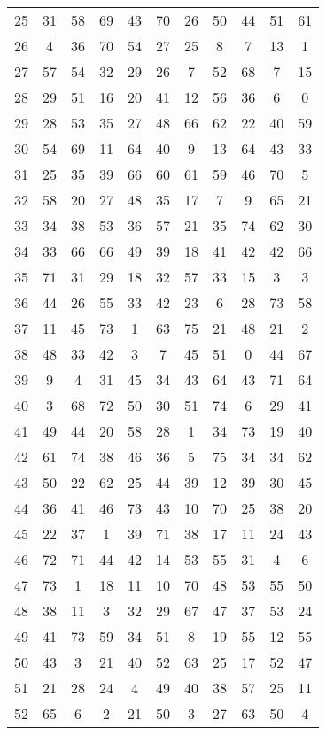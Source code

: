 \begin{table}
\begin{tabular}{c c c c c c c c c c c }
25 & 31 & 58 & 69 & 43 & 70 & 26 & 50 & 44 & 51 & 61 \\
26 & 4 & 36 & 70 & 54 & 27 & 25 & 8 & 7 & 13 & 1 \\
27 & 57 & 54 & 32 & 29 & 26 & 7 & 52 & 68 & 7 & 15 \\
28 & 29 & 51 & 16 & 20 & 41 & 12 & 56 & 36 & 6 & 0 \\
29 & 28 & 53 & 35 & 27 & 48 & 66 & 62 & 22 & 40 & 59 \\
30 & 54 & 69 & 11 & 64 & 40 & 9 & 13 & 64 & 43 & 33 \\
31 & 25 & 35 & 39 & 66 & 60 & 61 & 59 & 46 & 70 & 5 \\
32 & 58 & 20 & 27 & 48 & 35 & 17 & 7 & 9 & 65 & 21 \\
33 & 34 & 38 & 53 & 36 & 57 & 21 & 35 & 74 & 62 & 30 \\
34 & 33 & 66 & 66 & 49 & 39 & 18 & 41 & 42 & 42 & 66 \\
35 & 71 & 31 & 29 & 18 & 32 & 57 & 33 & 15 & 3 & 3 \\
36 & 44 & 26 & 55 & 33 & 42 & 23 & 6 & 28 & 73 & 58 \\
37 & 11 & 45 & 73 & 1 & 63 & 75 & 21 & 48 & 21 & 2 \\
38 & 48 & 33 & 42 & 3 & 7 & 45 & 51 & 0 & 44 & 67 \\
39 & 9 & 4 & 31 & 45 & 34 & 43 & 64 & 43 & 71 & 64 \\
40 & 3 & 68 & 72 & 50 & 30 & 51 & 74 & 6 & 29 & 41 \\
41 & 49 & 44 & 20 & 58 & 28 & 1 & 34 & 73 & 19 & 40 \\
42 & 61 & 74 & 38 & 46 & 36 & 5 & 75 & 34 & 34 & 62 \\
43 & 50 & 22 & 62 & 25 & 44 & 39 & 12 & 39 & 30 & 45 \\
44 & 36 & 41 & 46 & 73 & 43 & 10 & 70 & 25 & 38 & 20 \\
45 & 22 & 37 & 1 & 39 & 71 & 38 & 17 & 11 & 24 & 43 \\
46 & 72 & 71 & 44 & 42 & 14 & 53 & 55 & 31 & 4 & 6 \\
47 & 73 & 1 & 18 & 11 & 10 & 70 & 48 & 53 & 55 & 50 \\
48 & 38 & 11 & 3 & 32 & 29 & 67 & 47 & 37 & 53 & 24 \\
49 & 41 & 73 & 59 & 34 & 51 & 8 & 19 & 55 & 12 & 55 \\
50 & 43 & 3 & 21 & 40 & 52 & 63 & 25 & 17 & 52 & 47 \\
51 & 21 & 28 & 24 & 4 & 49 & 40 & 38 & 57 & 25 & 11 \\
52 & 65 & 6 & 2 & 21 & 50 & 3 & 27 & 63 & 50 & 4 \\

\end{tabular}
\end{table}
